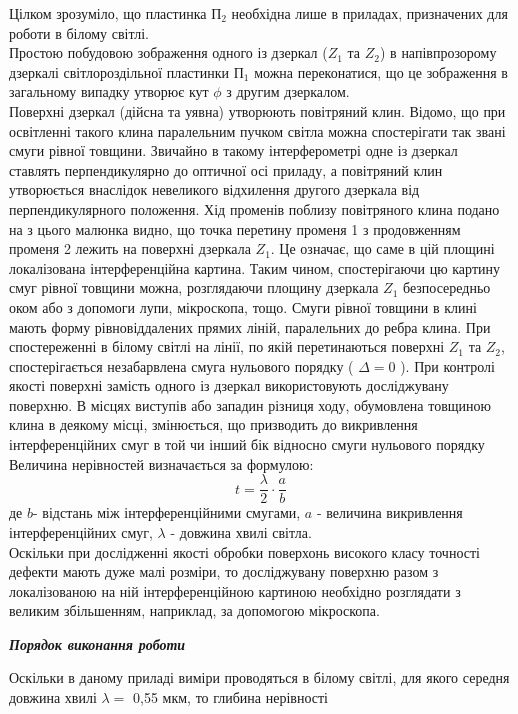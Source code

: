 Цілком зрозуміло, що пластинка $П_2$ необхідна лише в приладах, призначених для роботи в
білому світлі. \\
Простою побудовою зображення одного із дзеркал ($Z_1$ та $Z_2$) в напівпрозорому
дзеркалі світлороздільної пластинки $П_1$ можна переконатися, що це зображення в загальному
випадку утворює кут $\phi$ з другим дзеркалом. \\
Поверхні дзеркал (дійсна та уявна) утворюють повітряний клин. Відомо, що при
освітленні такого клина паралельним пучком світла можна спостерігати так звані смуги рівної
товщини. Звичайно в такому інтерферометрі одне із дзеркал ставлять перпендикулярно до
оптичної осі приладу, а повітряний клин утворюється внаслідок невеликого відхилення другого
дзеркала від перпендикулярного положення. Хід променів поблизу повітряного клина подано на
 з цього малюнка видно, що точка перетину променя 1 з продовженням променя 2 лежить
на поверхні дзеркала $Z_1$. Це означає, що саме в цій площині локалізована інтерференційна
картина. Таким чином, спостерігаючи цю картину смуг рівної товщини можна, розглядаючи
площину дзеркала $Z_1$ безпосередньо оком або з допомоги лупи, мікроскопа, тощо. Смуги рівної
товщини в клині мають форму рівновіддалених прямих ліній, паралельних до ребра клина. При
спостереженні в білому світлі на лінії, по якій перетинаються поверхні $Z_1$ та $Z_2$, спостерігається
незабарвлена смуга нульового порядку ( $\Delta = 0$   ). При контролі якості поверхні замість одного із
дзеркал використовують досліджувану поверхню. В місцях виступів або западин різниця ходу,
обумовлена товщиною клина в деякому місці, змінюється, що призводить до викривлення
інтерференційних смуг в той чи інший бік відносно смуги нульового порядку \\
Величина нерівностей визначається за формулою:
$$t = \frac{\lambda}{2} \cdot \frac{a}{b}$$
де $b$- відстань між інтерференційними смугами, $a$ - величина викривлення
інтерференційних смуг, $\lambda$ - довжина хвилі світла.\\
Оскільки при дослідженні якості обробки поверхонь високого класу точності дефекти
мають дуже малі розміри, то досліджувану поверхню разом з локалізованою на ній
інтерференційною картиною необхідно розглядати з великим збільшенням, наприклад, за
допомогою мікроскопа.
\begin{center}
  {\textbf{\emph{Порядок виконання роботи}}}
\end{center}
\indent Оскільки в даному приладі виміри проводяться в білому світлі, для якого середня
довжина хвилі $\lambda = $ 0,55 мкм, то глибина нерівності
